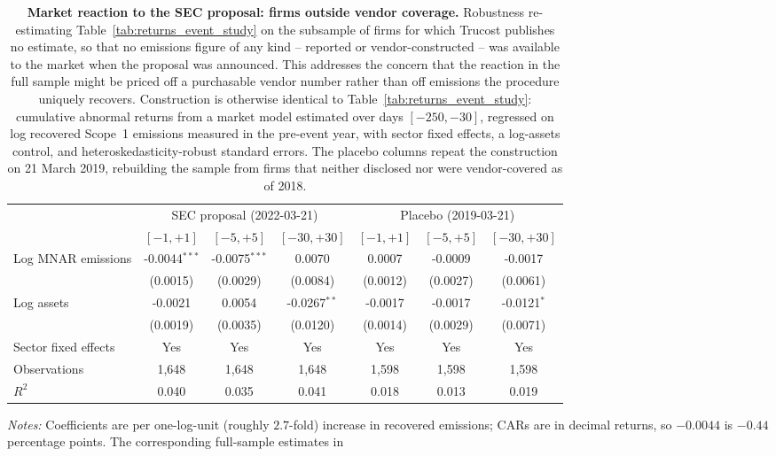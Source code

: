 \documentclass[a4paper,12pt]{article}
\begin{document}
\begin{table}[htbp]
\footnotesize\centering
\caption{\textbf{Market reaction to the SEC proposal: firms outside vendor coverage.}
Robustness re-estimating Table~\ref{tab:returns_event_study} on the subsample of
firms for which Trucost publishes no estimate, so that no emissions figure of any
kind -- reported or vendor-constructed -- was available to the market when the
proposal was announced. This addresses the concern that the reaction in the full
sample might be priced off a purchasable vendor number rather than off emissions
the procedure uniquely recovers. Construction is otherwise identical to
Table~\ref{tab:returns_event_study}: cumulative abnormal returns from a market
model estimated over days $[-250,-30]$, regressed on log recovered Scope~1
emissions measured in the pre-event year, with sector fixed effects, a log-assets
control, and heteroskedasticity-robust standard errors. The placebo columns repeat
the construction on 21 March 2019, rebuilding the sample from firms that neither
disclosed nor were vendor-covered as of 2018.}
\label{tab:returns_event_study_none}
\begin{tabular}{lcccccc}
\toprule
 & \multicolumn{3}{c}{SEC proposal (2022-03-21)} & \multicolumn{3}{c}{Placebo (2019-03-21)} \\
\cmidrule(lr){2-4}\cmidrule(lr){5-7}
 & $[-1,+1]$ & $[-5,+5]$ & $[-30,+30]$ & $[-1,+1]$ & $[-5,+5]$ & $[-30,+30]$ \\
\midrule
Log MNAR emissions & -0.0044$^{***}$ & -0.0075$^{***}$ & 0.0070 & 0.0007 & -0.0009 & -0.0017 \\
 & (0.0015) & (0.0029) & (0.0084) & (0.0012) & (0.0027) & (0.0061) \\
Log assets & -0.0021 & 0.0054 & -0.0267$^{**}$ & -0.0017 & -0.0017 & -0.0121$^{*}$ \\
 & (0.0019) & (0.0035) & (0.0120) & (0.0014) & (0.0029) & (0.0071) \\
\midrule
Sector fixed effects & Yes & Yes & Yes & Yes & Yes & Yes \\
Observations & 1,648 & 1,648 & 1,648 & 1,598 & 1,598 & 1,598 \\
$R^2$ & 0.040 & 0.035 & 0.041 & 0.018 & 0.013 & 0.019 \\
\bottomrule
\end{tabular}
\begin{flushleft}\footnotesize
\textit{Notes:} Coefficients are per one-log-unit (roughly $2.7$-fold) increase in
recovered emissions; CARs are in decimal returns, so $-0.0044$ is $-0.44$
percentage points. The corresponding full-sample estimates in

\end{flushleft}
\end{table}
\end{document}

